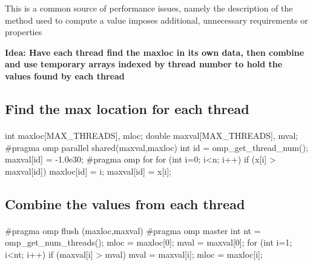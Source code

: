 \documentclass[%
oneside,                 %
final,                   %
10pt]{article}
\begin{document}
{{{{\noindent
This is a common source of performance issues, namely the description of the method used to compute a value imposes additional, unnecessary requirements or properties

\textbf{Idea: Have each thread find the maxloc in its own data, then combine and use temporary arrays indexed by thread number to hold the values found by each thread}



\subsection{Find the max location for each thread}

\paragraph{}















\bcppcod
int maxloc[MAX_THREADS], mloc;
double maxval[MAX_THREADS], mval; 
#pragma omp parallel shared(maxval,maxloc)
{
  int id = omp_get_thread_num(); 
  maxval[id] = -1.0e30;
#pragma omp for
   for (int i=0; i<n; i++) {
       if (x[i] > maxval[id]) { 
           maxloc[id] = i;
           maxval[id] = x[i]; 
       }
    }
}

\ecppcod



\subsection{Combine the values from each thread}

\paragraph{}














\bcppcod
#pragma omp flush (maxloc,maxval)
#pragma omp master
  {
    int nt = omp_get_num_threads(); 
    mloc = maxloc[0]; 
    mval = maxval[0]; 
    for (int i=1; i<nt; i++) {
        if (maxval[i] > mval) { 
           mval = maxval[i]; 
           mloc = maxloc[i];
        } 
     }
   }

}}}}
\end{document}
